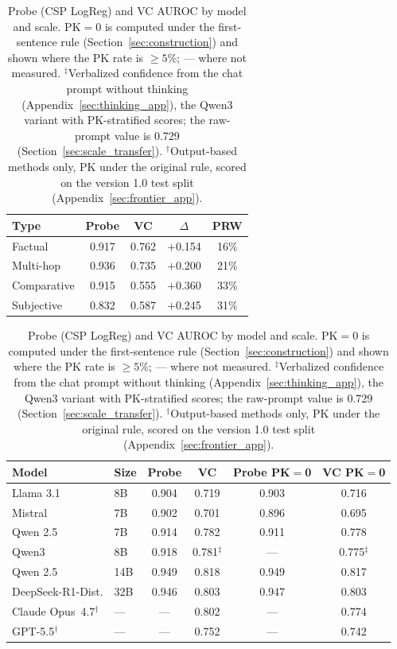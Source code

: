 \documentclass[acmsmall,screen,review]{acmart}
\begin{document}
\begin{table}[t]
\centering
\begin{minipage}[t]{0.40\textwidth}
\centering
\caption{Per-type AUROC for Mistral~7B; Probe = Standard (LogReg). PRW = fraction of test items where the Standard probe is correct and VC is wrong, both at a threshold of 0.5.}
\label{tab:per_qtype}
\footnotesize
\begin{tabular}{@{}lcccc@{}}
\toprule
Type & Probe & VC & $\Delta$ & PRW \\
\midrule
  Factual     & 0.917 & 0.762 & $+$0.154 & 16\% \\
  Multi-hop   & 0.936 & 0.735 & $+$0.200 & 21\% \\
  Comparative & 0.915 & 0.555 & $+$0.360 & 33\% \\
  Subjective  & 0.832 & 0.587 & $+$0.245 & 31\% \\
\bottomrule
\end{tabular}
\end{minipage}\hfill
\begin{minipage}[t]{0.58\textwidth}
\centering
\caption{Probe (CSP LogReg) and VC AUROC by model and scale. PK$=$0 is computed under the first-sentence rule (Section~\ref{sec:construction}) and shown where the PK rate is $\geq 5\%$; --- where not measured. $^\ddagger$Verbalized confidence from the chat prompt without thinking (Appendix~\ref{sec:thinking_app}), the Qwen3 variant with PK-stratified scores; the raw-prompt value is 0.729 (Section~\ref{sec:scale_transfer}). $^\dagger$Output-based methods only, PK under the original rule, scored on the version 1.0 test split (Appendix~\ref{sec:frontier_app}).}
\label{tab:scale}
\footnotesize
\begin{tabular}{@{}llcccc@{}}
\toprule
Model & Size & Probe & VC & Probe PK$=$0 & VC PK$=$0 \\
\midrule
Llama 3.1         & 8B  & 0.904 & 0.719 & 0.903 & 0.716 \\
Mistral           & 7B  & 0.902 & 0.701 & 0.896 & 0.695 \\
Qwen 2.5          & 7B  & 0.914 & 0.782 & 0.911 & 0.778 \\
Qwen3             & 8B  & 0.918 & 0.781$^\ddagger$ & ---   & 0.775$^\ddagger$ \\
Qwen 2.5          & 14B & 0.949 & 0.818 & 0.949 & 0.817 \\
DeepSeek-R1-Dist. & 32B & 0.946 & 0.803 & 0.947 & 0.803 \\
\midrule
Claude Opus~4.7$^\dagger$ & --- & --- & 0.802 & --- & 0.774 \\
GPT-5.5$^\dagger$         & --- & --- & 0.752 & --- & 0.742 \\
\bottomrule
\end{tabular}
\end{minipage}
\end{table}
\end{document}

